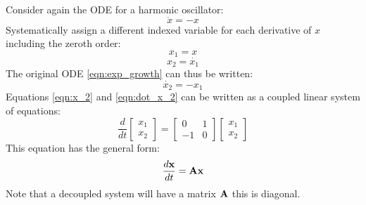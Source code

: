 \documentclass[a4paper,11pt,landscape]{article}
\begin{document}
Consider again the ODE for a harmonic oscillator:
\begin{equation} \label{eqn:exp_growth2} 
    \ddot{x} = -x
\end{equation}
Systematically assign a different indexed variable for each derivative of $x$ including the zeroth order:
\begin{equation}
    x_1 = x 
\end{equation}
\begin{equation} \label{eqn:x_2}
    x_2 = \dot{x_1}
\end{equation}
The original ODE \eqref{eqn:exp_growth} can thus be written:
\begin{equation} \label{eqn:dot_x_2}
    \dot{x_2} = -x_1
\end{equation}
Equations \eqref{eqn:x_2} and \eqref{eqn:dot_x_2} can be written as a coupled linear system of equations:
\begin{equation} 
\frac{d}{dt} \begin{bmatrix} x_1 \\ x_2 \end{bmatrix} = 
\begin{bmatrix}
0 & 1 \\ -1 & 0
\end{bmatrix}
\begin{bmatrix}
x_1 \\ x_2
\end{bmatrix}
\label{eqn:coupled_linear_harmonic_osc_ode}
\end{equation}
This equation has the general form:
\begin{equation} 
\frac{ d \bf{x} }{dt}  = 
\bf{A} \bf{x}
\label{eqn:general_coupled_linear_odes}
\end{equation}
Note that a decoupled system will have a matrix $\bf{A}$ this is diagonal.  
\end{document}
